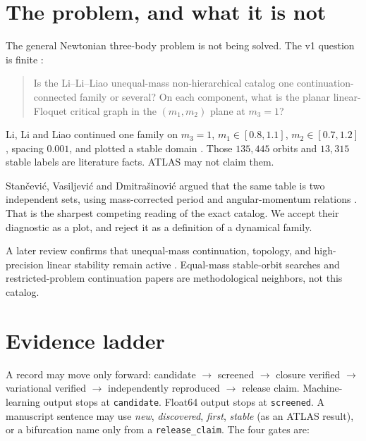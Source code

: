 \documentclass[11pt]{article}
\begin{document}
\section{The problem, and what it is not}

The general Newtonian three-body problem is not being solved.
The v1 question is finite \cite{li2021stable,stancevic2023moth,li2025review}:

\begin{quote}
Is the Li--Li--Liao unequal-mass non-hierarchical catalog one
continuation-connected family or several?
On each component, what is the planar linear-Floquet critical graph in the
$(m_1,m_2)$ plane at $m_3=1$?
\end{quote}

Li, Li and Liao continued one family on $m_3=1$, $m_1\in[0.8,1.1]$,
$m_2\in[0.7,1.2]$, spacing $0.001$, and plotted a stable domain
\cite{li2021stable}.
Those $135{,}445$ orbits and $13{,}315$ stable labels are literature facts.
ATLAS may not claim them.

Stan\v{c}evi\'c, Vasiljevi\'c and Dmitra\v{s}inovi\'c argued that the same
table is two independent sets, using mass-corrected period and angular-momentum
relations \cite{stancevic2023moth}.
That is the sharpest competing reading of the exact catalog.
We accept their diagnostic as a plot, and reject it as a definition of a
dynamical family.

A later review confirms that unequal-mass continuation, topology, and
high-precision linear stability remain active \cite{li2025review}.
Equal-mass stable-orbit searches \cite{hristov2025stable} and restricted-problem
continuation papers are methodological neighbors, not this catalog.

\section{Evidence ladder}

A record may move only forward:
candidate $\to$ screened $\to$ closure verified $\to$
variational verified $\to$ independently reproduced $\to$ release claim.
Machine-learning output stops at \texttt{candidate}.
Float64 output stops at \texttt{screened}.
A manuscript sentence may use \emph{new}, \emph{discovered}, \emph{first},
\emph{stable} (as an ATLAS result), or a bifurcation name only from a
\texttt{release\_claim}.
The four gates are:
\end{document}
